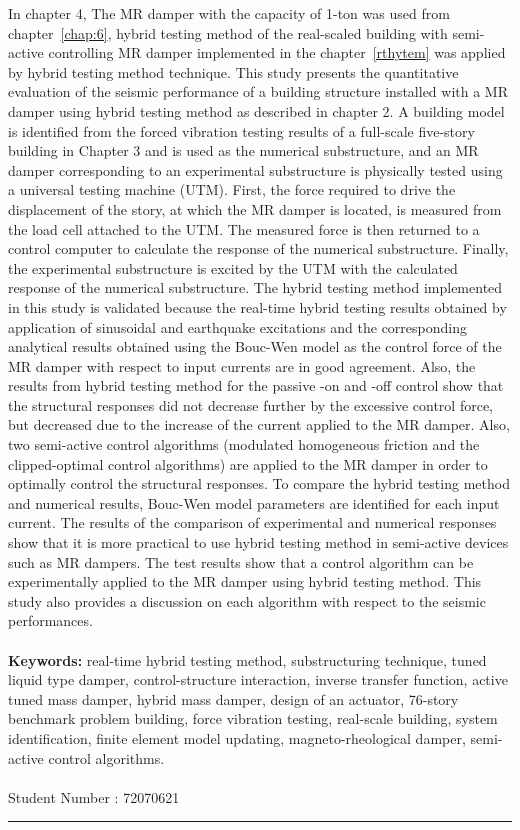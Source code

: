 In chapter 4, The MR damper with the capacity of 1-ton was used from chapter~\ref{chap:6}, hybrid testing method of the real-scaled building with semi-active controlling MR damper implemented in the chapter~\ref{rthytem} was applied by hybrid testing method technique. This study presents the quantitative evaluation of the seismic performance of a building structure installed with a MR damper using hybrid testing method as described in chapter 2. A building model is identified from the forced vibration testing results of a full-scale five-story building in Chapter 3 and is used as the numerical substructure, and an MR damper corresponding to an experimental substructure is physically tested using a universal testing machine (UTM). First, the force required to drive the displacement of the story, at which the MR damper is located, is measured from the load cell attached to the UTM. The measured force is then returned to a control computer to calculate the response of the numerical substructure. Finally, the experimental substructure is excited by the UTM with the calculated response of the numerical substructure. The hybrid testing method implemented in this study is validated because the real-time hybrid testing results obtained by application of sinusoidal and earthquake excitations and the corresponding analytical results obtained using the Bouc-Wen model as the control force of the MR damper with respect to input currents are in good agreement. Also, the results from hybrid testing method for the passive -on and -off control show that the structural responses did not decrease further by the excessive control force, but decreased due to the increase of the current applied to the MR damper. Also, two semi-active control algorithms (modulated homogeneous friction and the clipped-optimal control algorithms) are applied to the MR damper in order to optimally control the structural responses. To compare the hybrid testing method and numerical results, Bouc-Wen model parameters are identified for each input current. The results of the comparison of experimental and numerical responses show that it is more practical to use hybrid testing method in semi-active devices such as MR dampers. The test results show that a control algorithm can be experimentally applied to the MR damper using hybrid testing method. This study also provides a discussion on each algorithm with respect to the seismic performances.
\\
\\
{\large\textbf{Keywords:}}
real-time hybrid testing method, substructuring technique, tuned liquid type damper, control-structure interaction, inverse transfer function, active tuned mass damper, hybrid mass damper, design of an actuator, 76-story benchmark problem building, force vibration testing, real-scale building, system identification, finite element model updating, magneto-rheological damper, semi-active control algorithms.
\\
\\
Student Number : 72070621\\
\noindent\rule[2pt]{\textwidth}{0.5pt}
